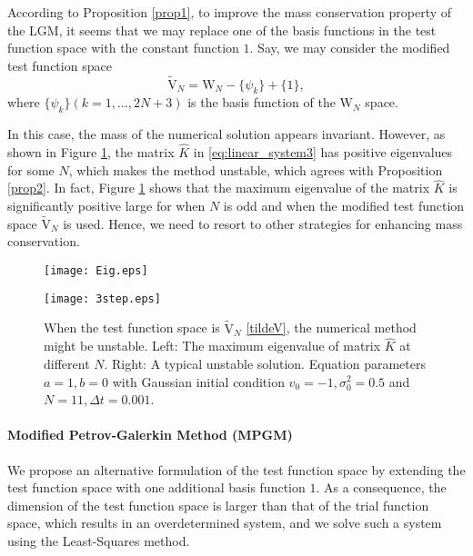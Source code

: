  According to Proposition \ref{prop1}, to improve the mass conservation property of the LGM, it seems that we may replace one of the basis functions in  the test function space with the constant function $1$. Say, we may consider the modified test function space
\begin{equation} \label{tildeV}
    \tilde{\mathrm{V}}_N=\mathrm{W}_N-\{\psi_k\} +\{1\},
\end{equation}
where $\{\psi_k\}(k=1,...,2N+3)$ is the basis function of the $\mathrm{W}_N$ space.

In this case, the mass of the numerical solution appears invariant. However, as shown in Figure \ref{fig:stable}, the matrix $\hat{K}$ in \eqref{eq:linear_system3} has positive eigenvalues for some $N$, which makes the method unstable, which agrees with Proposition \ref{prop2}. In fact, Figure \ref{fig:stable} shows that the maximum eigenvalue of the matrix $\hat{K}$ is significantly positive large  for when $N$ is odd and when the modified test function space $\tilde{\mathrm{V}}_N$ is used. Hence, we need to resort to other strategies for enhancing mass conservation. 
\begin{figure}[!htb]
    \centering
        \begin{minipage}[c]{0.49\textwidth}
            \centering
            \texttt{[image: Eig.eps]}
        \end{minipage}
        \begin{minipage}[c]{0.49\textwidth}
            \centering
            \texttt{[image: 3step.eps]}
        \end{minipage}
        \caption{When the test function space is $\tilde{\mathrm{V}}_N$ \eqref{tildeV}, the numerical method might be unstable. Left: The maximum eigenvalue of matrix $\hat{K}$ at different $N$. Right: A typical unstable solution. Equation parameters $a=1, b=0$ with Gaussian initial condition $v_0=-1, \sigma_0^2=0.5$ and $N=11,\Delta t=0.001$.}
        \label{fig:stable}
\end{figure}



\paragraph{Modified Petrov-Galerkin Method (MPGM)} We propose an alternative formulation of the test function space by extending the test function space with one additional basis function $1$. As a consequence, the dimension of the test function space is larger than that of the trial function space, which results in an overdetermined system, and we solve such a system using the Least-Squares method. 

